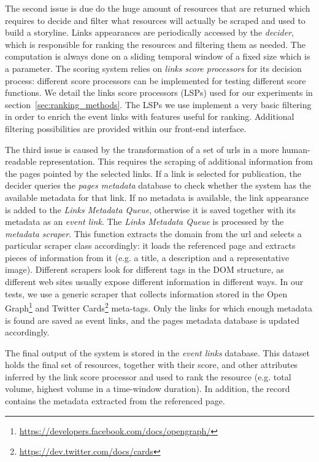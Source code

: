\documentclass{sig-alternate}
\begin{document}
The second issue is due do the huge amount of resources that are returned which requires to decide and filter what resources will actually be scraped and used to build a storyline. Links appearances are periodically accessed by the \emph{decider}, which is responsible for ranking the resources and filtering them as needed. The computation is always done on a sliding temporal window of a fixed size which is a parameter. The scoring system relies on \emph{links score processors} for its decision process: different score processors can be implemented for testing different score functions. We detail the links score processors (LSPs) used for our experiments in section~\ref{sec:ranking_methods}. The LSPs we use implement a very basic filtering in order to enrich the event links with features useful for ranking. Additional filtering possibilities are provided within our front-end interface.

The third issue is caused by the transformation of a set of urls in a more human-readable representation. This requires the scraping of additional information from the pages pointed by the selected links. If a link is selected for publication, the decider queries the \emph{pages metadata} database to check whether the system has the available metadata for that link. If no metadata is available, the link appearance is added to the \emph{Links Metadata Queue}, otherwise it is saved together with its metadata as an \emph{event link}. The \emph{Links Metadata Queue} is processed by the \emph{metadata scraper}. This function extracts the domain from the url and selects a particular scraper class accordingly: it loads the referenced page and extracts pieces of information from it (e.g. a title, a description and a representative image). Different scrapers look for different tags in the DOM structure, as different web sites usually expose different information in different ways. In our tests, we use a generic scraper that collects information stored in the Open Graph\footnote{\url{https://developers.facebook.com/docs/opengraph/}} and Twitter Cards\footnote{\url{https://dev.twitter.com/docs/cards}} meta-tags. Only the links for which enough metadata is found are saved as event links, and the pages metadata database is updated accordingly.

The final output of the system is stored in the \emph{event links} database. This dataset holds the final set of resources, together with their score, and other attributes inferred by the link score processor and used to rank the resource (e.g. total volume, highest volume in a time-window duration). In addition, the record contains the metadata extracted from the referenced page.
\end{document}
